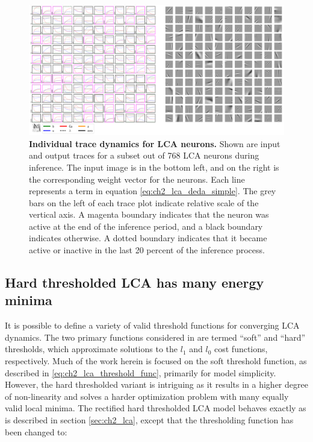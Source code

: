 \begin{figure}[h]\label{fig:ch2_lca_inference_traces}
    \centering
    \includegraphics[width=\textwidth]{figures/lca_inference_traces.png}
    \caption{\textbf{Individual trace dynamics for LCA neurons.} Shown are input and output traces for a subset out of 768 LCA neurons during inference. The input image is in the bottom left, and on the right is the corresponding weight vector for the neurons. Each line represents a term in equation \ref{eq:ch2_lca_deda_simple}. The grey bars on the left of each trace plot indicate relative scale of the vertical axis. A magenta boundary indicates that the neuron was active at the end of the inference period, and a black boundary indicates otherwise. A dotted boundary indicates that it became active or inactive in the last 20 percent of the inference process.}
\end{figure}


\subsection{Hard thresholded LCA has many energy minima}\label{sec:ch2_hard_lca}
It is possible to define a variety of valid threshold functions for converging LCA dynamics. The two primary functions considered in \parencite{rozell2008sparse} are termed ``soft'' and ``hard'' thresholds, which approximate solutions to the $l_{1}$ and $l_{0}$ cost functions, respectively. Much of the work herein is focused on the soft threshold function, as described in \ref{eq:ch2_lca_threshold_func}, primarily for model simplicity. However, the hard thresholded variant is intriguing as it results in a higher degree of non-linearity and solves a harder optimization problem with many equally valid local minima. The rectified hard thresholded LCA model behaves exactly as is described in section \ref{sec:ch2_lca}, except that the thresholding function has been changed to:

